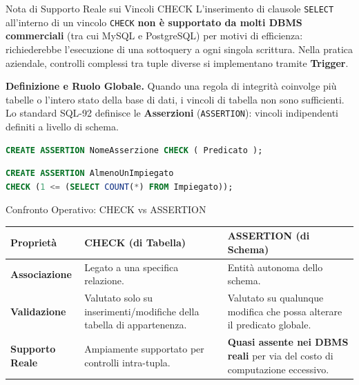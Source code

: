 \documentclass[12pt]{extarticle}
\begin{document}
\begin{cbox}{Nota di Supporto Reale sui Vincoli CHECK}
\noindent L'inserimento di clausole \texttt{SELECT} all'interno di un vincolo \texttt{CHECK} \textbf{non è supportato da molti DBMS commerciali} (tra cui MySQL e PostgreSQL) per motivi di efficienza: richiederebbe l'esecuzione di una sottoquery a ogni singola scrittura. Nella pratica aziendale, controlli complessi tra tuple diverse si implementano tramite \textbf{Trigger}.
\end{cbox}

\noindent \textbf{Definizione e Ruolo Globale.} Quando una regola di integrità coinvolge più tabelle o l'intero stato della base di dati, i vincoli di tabella non sono sufficienti. Lo standard SQL-92 definisce le \textbf{Asserzioni} (\texttt{ASSERTION}): vincoli indipendenti definiti a livello di schema.
\begin{lstlisting}[language=SQL]
CREATE ASSERTION NomeAsserzione CHECK ( Predicato );
\end{lstlisting}

\begin{lstlisting}[language=SQL, caption={Esempio: garantire almeno un impiegato nel database}]
CREATE ASSERTION AlmenoUnImpiegato
CHECK (1 <= (SELECT COUNT(*) FROM Impiegato));
\end{lstlisting}

\begin{cbox}{Confronto Operativo: CHECK vs ASSERTION}
\begin{center}
\small
\begin{tabular}{lp{6.2cm}p{6.2cm}}
    \toprule
    \textbf{Proprietà} & \textbf{CHECK (di Tabella)} & \textbf{ASSERTION (di Schema)} \\
    \midrule
    \textbf{Associazione} & Legato a una specifica relazione. & Entità autonoma dello schema. \\
    \addlinespace
    \textbf{Validazione} & Valutato solo su inserimenti/modifiche della tabella di appartenenza. & Valutato su qualunque modifica che possa alterare il predicato globale. \\
    \addlinespace
    \textbf{Supporto Reale} & Ampiamente supportato per controlli intra-tupla. & \textbf{Quasi assente nei DBMS reali} per via del costo di computazione eccessivo. \\
    \bottomrule
\end{tabular}
\end{center}
\end{cbox}
\end{document}
